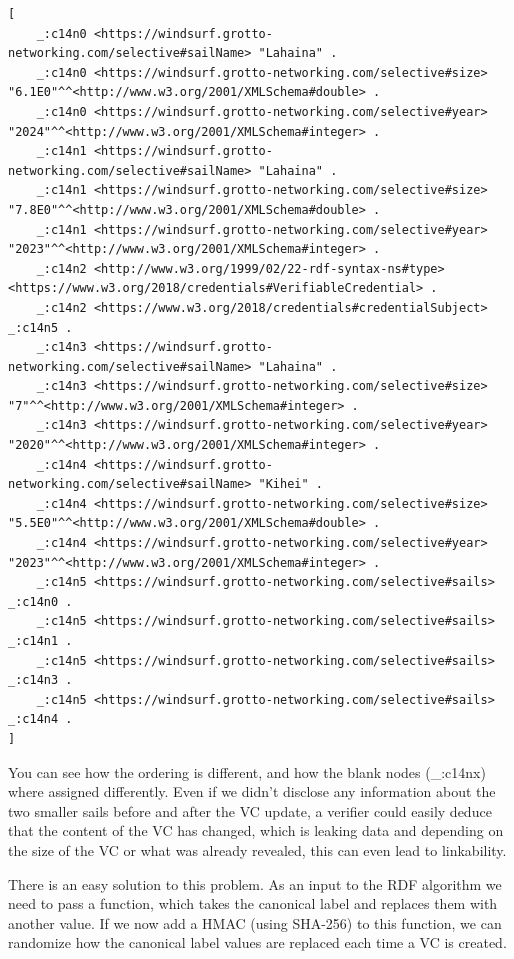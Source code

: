 \documentclass[
	a4paper               %
	,BCOR=0mm            %
	,bibliography=totoc   %
	,listof=totoc         %
	,monolingual
	,twoside=false
]{bfhthesis}              %
\begin{document}
\begin{lstlisting}[language=canon,firstnumber=1,caption={Example: Updated sails VC as statements},captionpos=b]
[
	_:c14n0 <https://windsurf.grotto-networking.com/selective#sailName> "Lahaina" .
	_:c14n0 <https://windsurf.grotto-networking.com/selective#size> "6.1E0"^^<http://www.w3.org/2001/XMLSchema#double> .
	_:c14n0 <https://windsurf.grotto-networking.com/selective#year> "2024"^^<http://www.w3.org/2001/XMLSchema#integer> .
	_:c14n1 <https://windsurf.grotto-networking.com/selective#sailName> "Lahaina" .
	_:c14n1 <https://windsurf.grotto-networking.com/selective#size> "7.8E0"^^<http://www.w3.org/2001/XMLSchema#double> .
	_:c14n1 <https://windsurf.grotto-networking.com/selective#year> "2023"^^<http://www.w3.org/2001/XMLSchema#integer> .
	_:c14n2 <http://www.w3.org/1999/02/22-rdf-syntax-ns#type> <https://www.w3.org/2018/credentials#VerifiableCredential> .
	_:c14n2 <https://www.w3.org/2018/credentials#credentialSubject> _:c14n5 .
	_:c14n3 <https://windsurf.grotto-networking.com/selective#sailName> "Lahaina" .
	_:c14n3 <https://windsurf.grotto-networking.com/selective#size> "7"^^<http://www.w3.org/2001/XMLSchema#integer> .
	_:c14n3 <https://windsurf.grotto-networking.com/selective#year> "2020"^^<http://www.w3.org/2001/XMLSchema#integer> .
	_:c14n4 <https://windsurf.grotto-networking.com/selective#sailName> "Kihei" .
	_:c14n4 <https://windsurf.grotto-networking.com/selective#size> "5.5E0"^^<http://www.w3.org/2001/XMLSchema#double> .
	_:c14n4 <https://windsurf.grotto-networking.com/selective#year> "2023"^^<http://www.w3.org/2001/XMLSchema#integer> .
	_:c14n5 <https://windsurf.grotto-networking.com/selective#sails> _:c14n0 .
	_:c14n5 <https://windsurf.grotto-networking.com/selective#sails> _:c14n1 .
	_:c14n5 <https://windsurf.grotto-networking.com/selective#sails> _:c14n3 .
	_:c14n5 <https://windsurf.grotto-networking.com/selective#sails> _:c14n4 .
]
\end{lstlisting}

You can see how the ordering is different, and how the blank nodes (\_:c14nx) where assigned differently.
Even if we didn't disclose any information about the two smaller sails before and after the VC update, a verifier could easily deduce that the content of the VC has changed, which is leaking data and depending on the size of the VC or what was already revealed, this can even lead to linkability.

There is an easy solution to this problem.
As an input to the RDF algorithm we need to pass a function, which takes the canonical label and replaces them with another value.
If we now add a HMAC (using SHA-256) to this function, we can randomize how the canonical label values are replaced each time a VC is created.
\end{document}
